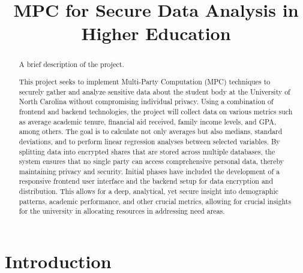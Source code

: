 \documentclass[conference]{IEEEtran}
\begin{document}
\title{MPC for Secure Data Analysis in Higher Education}


\author{
\and
{}
\and
{}
\and
{}
\and
{}
}

\maketitle

\begin{abstract}


A brief description of the project.

This project seeks to implement Multi-Party Computation (MPC) techniques to securely gather and analyze sensitive data about the student body at the University of North Carolina without compromising individual privacy.
Using a combination of frontend and backend technologies, the project will collect data on various metrics such as average academic tenure, financial aid received, family income levels, and GPA, among others. 
The goal is to calculate not only averages but also medians, standard deviations, and to perform linear regression analyses between selected variables. 
By splitting data into encrypted shares that are stored across multiple databases, the system ensures that no single party can access comprehensive personal data, thereby maintaining privacy and security. 
Initial phases have included the development of a responsive frontend user interface and the backend setup for data encryption and distribution. 
This allows for a deep, analytical, yet secure insight into demographic patterns, academic performance, and other crucial metrics, allowing for crucial insights for the university in allocating resources in addressing need areas. 

\end{abstract}


\section{Introduction}


\end{document}
